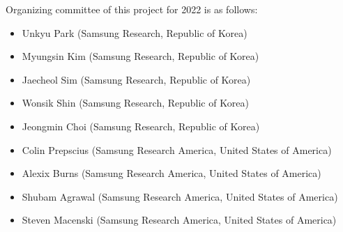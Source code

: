 Organizing committee of this project for 2022 is as follows:
\begin{itemize}
\item
Unkyu Park (Samsung Research, Republic of Korea)
\item
Myungsin Kim (Samsung Research, Republic of Korea)
\item
Jaecheol Sim (Samsung Research, Republic of Korea)
\item
Wonsik Shin (Samsung Research, Republic of Korea)
\item
Jeongmin Choi (Samsung Research, Republic of Korea)
\item
Colin Prepscius (Samsung Research America, United States of America)
\item
Alexix Burns (Samsung Research America, United States of America)
\item
Shubam Agrawal (Samsung Research America, United States of America)
\item
Steven Macenski (Samsung Research America, United States of America)
\end{itemize}
